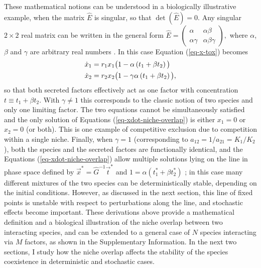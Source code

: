 These mathematical notions can be understood in a biologically illustrative example, when the matrix $\hat{E}$ is singular, so that $\det(\hat{E})=0$. Any singular $2\times 2$ real matrix can be written in the general form  $\hat{E}=\begin{pmatrix}
\alpha   & \alpha\beta \\
\alpha\gamma & \alpha\beta\gamma
\end{pmatrix},$
where $\alpha$, $\beta$ and $\gamma$ are arbitrary real numbers \cite{Larson2016}. In this case Equation (\ref{eq-x-tox}) becomes
\begin{align}
\dot{x}_1 &= r_1 x_1\big(1 -        \alpha\left( t_1 + \beta t_2 \right) \big) \notag \\
\dot{x}_2 &= r_2 x_2\big(1 - \gamma \alpha\left( t_1 + \beta t_2 \right) \big),
\label{eq-xdot-niche-overlap}
\end{align}
so that both secreted factors effectively act as one factor with concentration  $t\equiv t_1 + \beta t_2$. With $\gamma\neq 1$ this corresponds to the classic notion of two species and only one limiting factor. The two equations cannot be simultaneously satisfied and the only solution of Equations (\ref{eq-xdot-niche-overlap}) is either $x_1=0$ or $x_2=0$ (or both). This is one example of competitive exclusion due to competition within a single niche.
Finally, when $\gamma=1$ (corresponding to  $a_{12}=1/a_{21}=K_1/K_2$), both the species and the secreted factors are functionally identical, and the Equations (\ref{eq-xdot-niche-overlap}) allow multiple solutions lying on the line in phase space defined by $\vec{x}^*=\hat{G}^{-1}\vec{t}^*$  and $1=\alpha\left( t_1^* + \beta t_2^* \right)$ \cite{McGehee1977a,Constable2015}; in this case many different mixtures of the two species can be deterministically stable, depending on the initial conditions. However, as discussed in the next section, this line of fixed points is unstable with respect to perturbations along the line, and stochastic effects become important. These derivations above provide a mathematical definition and a biological illustration of the niche overlap between two interacting species, and can be extended to a general case of $N$ species interacting via $M$ factors, as shown in the Supplementary Information. 
In the next two sections, I study how the niche overlap affects the stability of the species coexistence in deterministic and stochastic cases.


